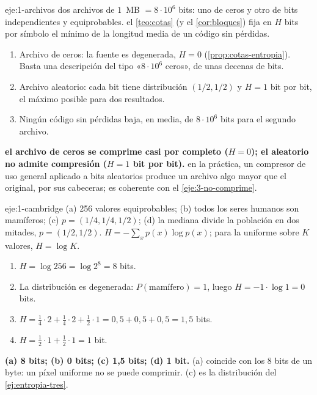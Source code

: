 \begin{solucion}{eje:1-archivos}
\datos dos archivos de $1$~MB $=8\cdot10^{6}$ bits: uno de ceros y otro de bits independientes y equiprobables.
\planteamiento el \cref{teo:cotas} (y el \cref{cor:bloques}) fija en $H$ bits por símbolo el mínimo de la longitud media de un código sin pérdidas.
\pasos
\begin{enumerate}[label=\arabic*.]
  \item Archivo de ceros: la fuente es degenerada, $H=0$ (\cref{prop:cotas-entropia}). Basta una descripción del tipo «$8\cdot10^{6}$ ceros», de unas decenas de bits.
  \item Archivo aleatorio: cada bit tiene distribución $(1/2,1/2)$ y $H=1$ bit por bit, el máximo posible para dos resultados.
  \item Ningún código sin pérdidas baja, en media, de $8\cdot10^{6}$ bits para el segundo archivo.
\end{enumerate}
\resultado \textbf{el archivo de ceros se comprime casi por completo ($H=0$); el aleatorio no admite compresión ($H=1$ bit por bit).}
\comprobacion en la práctica, un compresor de uso general aplicado a bits aleatorios produce un archivo algo mayor que el original, por sus cabeceras; es coherente con el \cref{eje:3-no-comprime}.
\end{solucion}

\begin{solucion}{eje:1-cambridge}
\datos (a) 256 valores equiprobables; (b) todos los seres humanos son mamíferos; (c) $p=(1/4,1/4,1/2)$; (d) la mediana divide la población en dos mitades, $p=(1/2,1/2)$.
\planteamiento $H=-\sum_xp(x)\log p(x)$; para la uniforme sobre $K$ valores, $H=\log K$.
\pasos
\begin{enumerate}[label=(\alph*)]
  \item $H=\log 256=\log 2^{8}=8$ bits.
  \item La distribución es degenerada: $P(\text{mamífero})=1$, luego $H=-1\cdot\log 1=0$ bits.
  \item $H=\tfrac14\cdot 2+\tfrac14\cdot 2+\tfrac12\cdot 1=0{,}5+0{,}5+0{,}5=1{,}5$ bits.
  \item $H=\tfrac12\cdot 1+\tfrac12\cdot 1=1$ bit.
\end{enumerate}
\resultado \textbf{(a) 8 bits; (b) 0 bits; (c) 1,5 bits; (d) 1 bit.}
\comprobacion (a) coincide con los 8 bits de un byte: un píxel uniforme no se puede comprimir. (c) es la distribución del \cref{ej:entropia-tres}.
\end{solucion}


